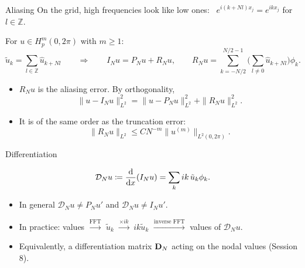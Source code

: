 \begin{frame}{Aliasing}
    On the grid, high frequencies look like low ones: \ $e^{i(k + Nl)x_j} = e^{ikx_j}$ for $l \in \mathbb Z$.
    \medskip

    For $u \in H^m_p(0,2\pi)$ with $m \ge 1$:
    \[
        \tilde u_k = \sum_{l \in \mathbb Z} \hat u_{k + Nl}
        \qquad \Longrightarrow \qquad
        I_N u = P_N u + R_N u, \qquad
        R_N u = \sum_{k = -N/2}^{N/2-1} \Big( \sum_{l \ne 0} \hat u_{k+Nl} \Big) \phi_k .
    \]
    \begin{itemize}
        \item $R_N u$ is the \alert{aliasing error}. By orthogonality,
              \[
                  \|u - I_N u\|^2_{L^2} = \|u - P_N u\|^2_{L^2} + \|R_N u\|^2_{L^2}.
              \]
        \item It is of the same order as the truncation error:
              \[
                  \|R_N u\|_{L^2} \le C N^{-m} \|u^{(m)}\|_{L^2(0,2\pi)} .
              \]
    \end{itemize}
\end{frame}

\begin{frame}{Differentiation}
    \begin{definition}
        \[
            \mathcal D_N u \coloneqq \frac{{\mathrm d}}{{\mathrm d} x} (I_N u) = \sum_{k} ik\, \tilde u_k \phi_k .
        \]
    \end{definition}
    \begin{itemize}
        \item In general $\mathcal D_N u \ne P_N u'$ and $\mathcal D_N u \ne I_N u'$.
        \item In practice: values $\xrightarrow{\text{FFT}}$ $\tilde u_k$ $\xrightarrow{\times ik}$ $ik\tilde u_k$ $\xrightarrow{\text{inverse FFT}}$ values of $\mathcal D_N u$.
        \item Equivalently, a differentiation matrix $\mathbf{D}_N$ acting on the nodal values (Session 8).
    \end{itemize}
\end{frame}

